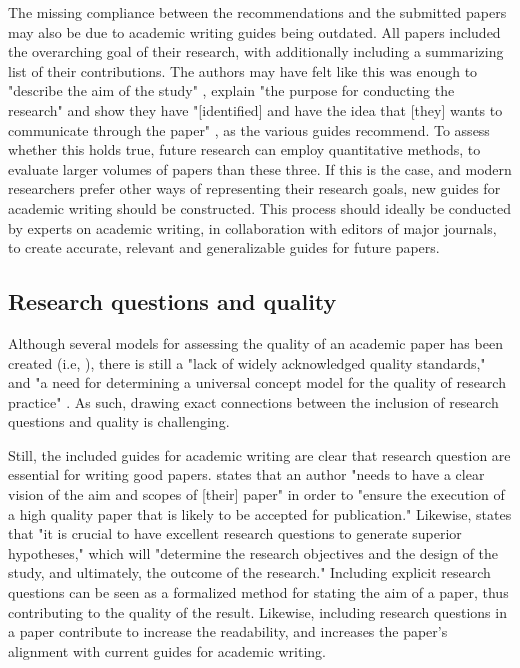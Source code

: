 The missing compliance between the recommendations and the submitted papers may also be due to academic writing guides being outdated. All papers included the overarching goal of their research, with \textcite{Barredo_2020} additionally including a summarizing list of their contributions. The authors may have felt like this was enough to "describe the aim of the study" \parencite[p.359]{Davidson_2012}, explain "the purpose for conducting the research" \parencite[p.115]{Cuschieri_2019} and show they have "[identified] and have the idea that [they] wants to communicate through the paper" \parencite[p.81]{Lin_2012}, as the various guides recommend. To assess whether this holds true, future research can employ quantitative methods, to evaluate larger volumes of papers than these three. If this is the case, and modern researchers prefer other ways of representing their research goals, new guides for academic writing should be constructed. This process should ideally be conducted by experts on academic writing, in collaboration with editors of major journals, to create accurate, relevant and generalizable guides for future papers.


\subsection{Research questions and quality}
Although several models for assessing the quality of an academic paper has been created (i.e, \cite{rubin_2011,Robey_1998,Klein_1999}), there is still a "lack of widely acknowledged quality standards," and "a need for determining a universal concept model for the quality of research practice" \parencite[p.595]{Martenson_2016}. As such, drawing exact connections between the inclusion of research questions and quality is challenging.

Still, the included guides for academic writing are clear that research question are essential for writing good papers. \textcite[p.114]{Cuschieri_2019} states that an author "needs to have a clear vision of the aim and scopes of [their] paper" in order to "ensure the execution of a high quality paper that is likely to be accepted for publication." Likewise, \textcite[p.9]{Barroga_2022} states that "it is crucial to have excellent research questions to generate superior hypotheses," which will "determine the research objectives and the design of the study, and ultimately, the outcome of the research." Including explicit research questions can be seen as a formalized method for stating the aim of a paper, thus contributing to the quality of the result. Likewise, including research questions in a paper contribute to increase the readability, and increases the paper's alignment with current guides for academic writing.


